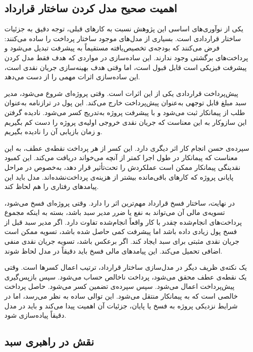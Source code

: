 \subsection{اهمیت صحیح مدل کردن ساختار قرارداد}
\label{subsec:contract_modeling_importance}

یکی از نوآوری‌های اساسی این پژوهش نسبت به کارهای قبلی، توجه دقیق
به جزئیات ساختار قراردادی است. بسیاری از مدل‌های موجود ساختار
پرداخت را ساده می‌کنند: فرض می‌کنند که بودجه‌ی تخصیص‌یافته
مستقیماً به پیشرفت تبدیل می‌شود و پرداخت‌های برگشتی وجود ندارند.
این ساده‌سازی در مواردی که هدف فقط مدل کردن پیشرفت فیزیکی است
قابل قبول است، اما وقتی هدف بهینه‌سازی جریان نقدی است، این
ساده‌سازی اثرات مهمی را از دست می‌دهد.

پیش‌پرداخت قراردادی یکی از این اثرات است. وقتی پروژه‌ای شروع
می‌شود، مدیر سبد مبلغ قابل توجهی به‌عنوان پیش‌پرداخت خارج می‌کند.
این پول در ترازنامه به‌عنوان طلب از پیمانکار ثبت می‌شود و با
پیشرفت پروژه به‌تدریج کسر می‌شود. نادیده گرفتن این سازوکار
به این معناست که جریان نقدی خروجی اولیه‌ی پروژه را دست کم بگیریم
و زمان بازیابی آن را نادیده بگیریم.

سپرده‌ی حسن انجام کار اثر دیگری دارد. این کسر از هر پرداخت نقطه‌ی
عطف، به این معناست که پیمانکار در طول اجرا کمتر از آنچه می‌خواند
دریافت می‌کند. این کمبود نقدینگی پیمانکار ممکن است عملکردش را
تحت‌تأثیر قرار دهد، به‌خصوص در مراحل پایانی پروژه که کارهای باقی‌مانده
بیشتر از هزینه‌ی پرداخت‌نشده‌اند. مدل باید این پیامدهای
رفتاری را هم لحاظ کند.

در نهایت، ساختار فسخ قرارداد مهم‌ترین اثر را دارد. وقتی پروژه‌ای
فسخ می‌شود، تسویه‌ی مالی آن می‌تواند به نفع یا ضرر مدیر سبد
باشد، بسته به اینکه مجموع پرداخت‌های انجام‌شده چقدر با کار
واقعاً انجام‌شده تفاوت دارد. اگر مدیر سبد قبل از فسخ پول
زیادی داده باشد اما پیشرفت کمی حاصل شده باشد، تسویه ممکن است
جریان نقدی مثبتی برای سبد ایجاد کند. اگر برعکس باشد، تسویه
جریان نقدی منفی اضافی تحمیل می‌کند. این پیامدهای مالی فسخ
باید دقیقاً در مدل لحاظ شوند.

یک نکته‌ی ظریف دیگر در مدل‌سازی ساختار قرارداد، ترتیب اعمال
کسرها است. وقتی یک نقطه‌ی عطف محقق می‌شود، پرداخت ناخالص حساب
می‌شود. سپس بازپس‌گیری پیش‌پرداخت اعمال می‌شود. سپس سپرده‌ی
تضمین کسر می‌شود. حاصل پرداخت خالصی است که به پیمانکار منتقل
می‌شود. این توالی ساده به نظر می‌رسد، اما در شرایط نزدیکی پروژه
به فسخ یا پایان، جزئیات آن اهمیت پیدا می‌کند و باید در مدل
دقیقاً پیاده‌سازی شود.

\subsection{نقش  در راهبری سبد}
\label{subsec:evm_in_portfolio}

